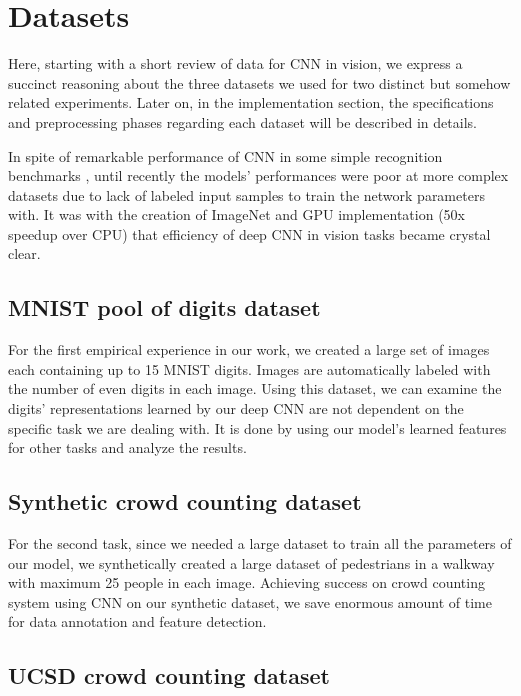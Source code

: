 \section{Datasets} 

Here, starting with a short review of data for CNN in vision, we express a succinct reasoning about the three datasets we used for two distinct but somehow related experiments. Later on, in the implementation section, the specifications and preprocessing phases regarding each dataset will be described in details. 

In spite of remarkable  performance of CNN in some simple recognition benchmarks \cite{cirecsan2011convolutional, ciresan2015multi, wan2013regularization, cirecsan2012multi}, until recently the models' performances were poor at more complex datasets \cite{griffin2007caltech} due to lack of labeled input samples to train the network parameters with. It was with the creation of ImageNet\cite{deng2009imagenet} and GPU implementation\cite{krizhevsky2012imagenet} (50x speedup over CPU) that efficiency of deep CNN in vision tasks became crystal clear.

\subsection{MNIST pool of digits dataset}

For the first empirical experience in our work, we created a large set of images each containing up to 15 MNIST digits. Images are automatically labeled with the number of even digits in each image. Using this dataset, we can examine the digits' representations learned by our deep CNN are not dependent on the specific task we are dealing with. It is done by using our model's learned features for other tasks and analyze the results. 

\subsection{Synthetic crowd counting dataset}

For the second task, since we needed a large dataset to train all the parameters of our model, we synthetically created a large dataset of pedestrians in a walkway with maximum 25 people in each image. Achieving success on crowd counting system using CNN on our synthetic dataset, we save enormous amount of time for data annotation and feature detection. 

\subsection{UCSD crowd counting dataset}

